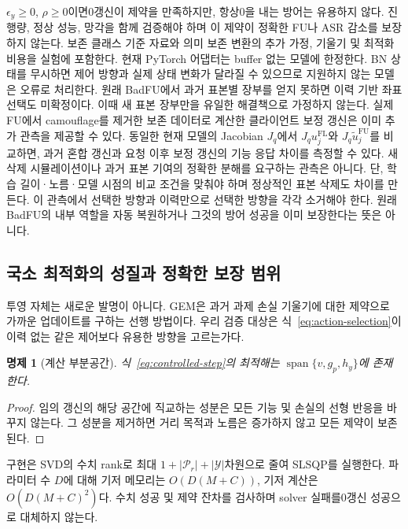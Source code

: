 \documentclass[10pt,a4paper]{article}
\newtheorem{proposition}{명제}
\begin{document}
$\epsilon_y\ge0$, $\rho\ge0$이면0갱신이 제약을 만족하지만, 항상0을 내는 방어는 유용하지 않다.
진행량, 정상 성능, 망각을 함께 검증해야 하며 이 제약이 정확한 FU나 ASR 감소를 보장하지 않는다.
보존 클래스 기준 자료와 의미 보존 변환의 추가 가정, 기울기 및 최적화 비용을 실험에 포함한다.
현재 PyTorch 어댑터는 buffer 없는 모델에 한정한다. BN 상태를 무시하면 제어 방향과 실제
상태 변화가 달라질 수 있으므로 지원하지 않는 모델은 오류로 처리한다.
원래 BadFU에서 과거 표본별 장부를 얻지 못하면 이력 기반 좌표 선택도 미확정이다.
이때 새 표본 장부만을 유일한 해결책으로 가정하지 않는다.
실제 FU에서 camouflage를 제거한 보존 데이터로 계산한 클라이언트 보정 갱신은 이미
추가 관측을 제공할 수 있다. 동일한 현재 모델의 Jacobian $J_q$에서
$J_q u_j^{\mathrm{FL}}$와 $J_q\widetilde u_j^{\mathrm{FU}}$를 비교하면,
과거 혼합 갱신과 요청 이후 보정 갱신의 기능 응답 차이를 측정할 수 있다.
새 삭제 시뮬레이션이나 과거 표본 기여의 정확한 분해를 요구하는 관측은 아니다.
단, 학습 길이·노름·모델 시점의 비교 조건을 맞춰야 하며 정상적인 표본 삭제도 차이를 만든다.
이 관측에서 선택한 방향과 이력만으로 선택한 방향을 각각 소거해야 한다.
원래 BadFU의 내부 역할을 자동 복원하거나 그것의 방어 성공을 이미 보장한다는 뜻은 아니다.

\subsection{국소 최적화의 성질과 정확한 보장 범위}
투영 자체는 새로운 발명이 아니다. GEM은 과거 과제 손실 기울기에 대한 제약으로
가까운 업데이트를 구하는 선행 방법이다\cite{gem}. 우리 검증 대상은
식~\eqref{eq:action-selection}이 이력 없는 같은 제어보다 유용한 방향을 고르는가다.

\begin{proposition}[계산 부분공간]
식~\eqref{eq:controlled-step}의 최적해는
$\operatorname{span}\{v,g_p,h_y\}$에 존재한다.
\end{proposition}
\begin{proof}
임의 갱신의 해당 공간에 직교하는 성분은 모든 기능 및 손실의 선형 반응을 바꾸지 않는다.
그 성분을 제거하면 거리 목적과 노름은 증가하지 않고 모든 제약이 보존된다.
\end{proof}
구현은 SVD의 수치 rank로 최대 $1+|\mathcal P_r|+|\mathcal Y|$차원으로 줄여 SLSQP를 실행한다.
파라미터 수 $D$에 대해 기저 메모리는 $O(D(M+C))$, 기저 계산은 $O(D(M+C)^2)$다.
수치 성공 및 제약 잔차를 검사하며 solver 실패를0갱신 성공으로 대체하지 않는다.
\end{document}
